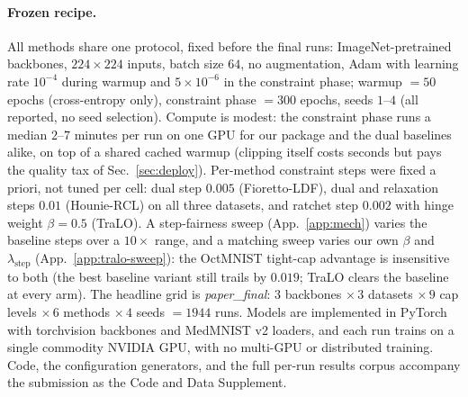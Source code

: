 \documentclass[10pt]{article}
\begin{document}
\paragraph{Frozen recipe.}
All methods share one protocol, fixed before the final runs:
ImageNet-pretrained backbones, $224{\times}224$ inputs, batch size $64$, no
augmentation, Adam with learning rate $10^{-4}$ during warmup and
$5{\times}10^{-6}$ in the constraint phase; warmup $=50$ epochs
(cross-entropy only), constraint phase $=300$ epochs, seeds $1$--$4$ (all
reported, no seed selection). Compute is modest: the constraint phase runs
a median $2$--$7$ minutes per run on one GPU for our package and the dual
baselines alike, on top of a shared cached warmup (clipping itself costs
seconds but pays the quality tax of Sec.~\ref{sec:deploy}). Per-method
constraint steps were fixed a priori, not tuned per cell: dual step $0.005$
(Fioretto-LDF), dual and relaxation steps $0.01$ (Hounie-RCL) on all three
datasets, and ratchet step $0.002$ with hinge weight $\beta{=}0.5$ (TraLO).
A step-fairness sweep (App.~\ref{app:mech}) varies the baseline steps
over a $10\times$ range, and a matching sweep varies our own $\beta$ and
$\lambda_{\text{step}}$ (App.~\ref{app:tralo-sweep}): the OctMNIST
tight-cap advantage is insensitive to both (the best baseline variant still
trails by $0.019$; TraLO clears the baseline at every arm). The headline
grid is \emph{paper\_final}: $3$ backbones $\times\,3$ datasets $\times\,9$
cap levels $\times\,6$ methods $\times\,4$ seeds $=1944$ runs. Models are
implemented in PyTorch with torchvision backbones and MedMNIST v2 loaders,
and each run trains on a single commodity NVIDIA GPU, with no multi-GPU or
distributed training. Code, the configuration generators, and the full
per-run results corpus accompany the submission as the Code and Data
Supplement.
\end{document}
